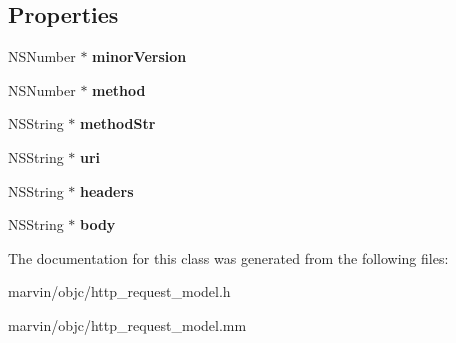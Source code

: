 \subsection*{Properties}
\begin{DoxyCompactItemize}
\item 
\mbox{\label{interface_http_request_model_acdb84a5d51dc3ac247b78c9092d9d391}} 
N\+S\+Number $\ast$ {\bfseries minor\+Version}
\item 
\mbox{\label{interface_http_request_model_af33b88fdfa37408c34e6bcd645322c8b}} 
N\+S\+Number $\ast$ {\bfseries method}
\item 
\mbox{\label{interface_http_request_model_afcf7ec9a72dbfe5ff47a695a02252cf9}} 
N\+S\+String $\ast$ {\bfseries method\+Str}
\item 
\mbox{\label{interface_http_request_model_add189cd0330b0b619a959c44cf642351}} 
N\+S\+String $\ast$ {\bfseries uri}
\item 
\mbox{\label{interface_http_request_model_a39993585a1bb2a4f150f3fb05bc8707b}} 
N\+S\+String $\ast$ {\bfseries headers}
\item 
\mbox{\label{interface_http_request_model_aa2ef33396ca26ceef8655f73d3e4ab53}} 
N\+S\+String $\ast$ {\bfseries body}
\end{DoxyCompactItemize}


The documentation for this class was generated from the following files\+:\begin{DoxyCompactItemize}
\item 
marvin/objc/http\+\_\+request\+\_\+model.\+h\item 
marvin/objc/http\+\_\+request\+\_\+model.\+mm\end{DoxyCompactItemize}
